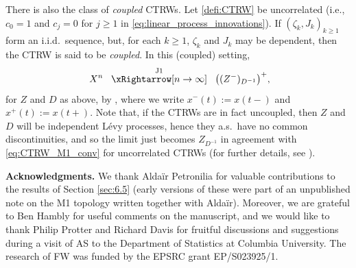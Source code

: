 \documentclass[11pt]{article}
\theoremstyle{definition}\newtheorem{example}[theorem]{Example}
\theoremstyle{definition}\newtheorem{counterexample}[theorem]{Counterexample}
\theoremstyle{definition}\newtheorem{remark}[theorem]{Remark}
\theoremstyle{definition}\newtheorem{defi}[theorem]{Definition}
\numberwithin{equation}{section}
\newcommand{\convw}[1]{\xRightarrow[ {#1}]{}}							%
\renewcommand{\|}{\; : \, \;}											%
\begin{document}
There is also the class of \emph{coupled} CTRWs. Let \eqref{defi:CTRW} be uncorrelated (i.e., $c_0=1$ and $c_j=0$ for $j\geq 1$ in \eqref{eq:linear_process_innovations}). If $(\zeta_k,J_k)_{k\geq 1}$ form an i.i.d.~sequence, but, for each $k\geq 1$, $\zeta_k$ and $J_k$ may be dependent, then the CTRW is said to be \emph{coupled}. In this (coupled) setting,
\begin{equation}\label{eq:coupled_CTRW_J1_conv}
	\; X^n \; \; \stackrel{\text{J1}}{\convw{n\to \infty}} \; \; \bigl((Z^-)_{D^{-1}}\bigr)^+,
\end{equation}
for $Z$ and $D$ as above, by \cite{henry_straka,jurlewicz}, where we write $x^-(t):=x(t-)$ and $x^+(t):=x(t+)$. Note that, if the CTRWs are in fact uncoupled, then $Z$ and $D$ will be independent L\'evy processes, hence they a.s.~have no common discontinuities, and so the limit just becomes $Z_{D^{-1}}$ in agreement with \eqref{eq:CTRW_M1_conv} for uncorrelated CTRWs (for further details, see \cite[Lem.~3.9]{henry_straka}).


	

\vspace{12pt}
\noindent\textbf{Acknowledgments.} We thank Alda\"{i}r Petronilia for valuable contributions to the results of Section \ref{sec:6.5} (early versions of these were part of an unpublished note on the M1 topology written together with Alda\"{i}r). Moreover, we are grateful to Ben Hambly for useful comments on the manuscript, and we would like to thank Philip Protter and Richard Davis for fruitful discussions and suggestions during a visit of AS to the Department of Statistics at Columbia University. The research of FW was funded by the EPSRC grant EP/S023925/1.


	






 \printbibliography
\end{document}
